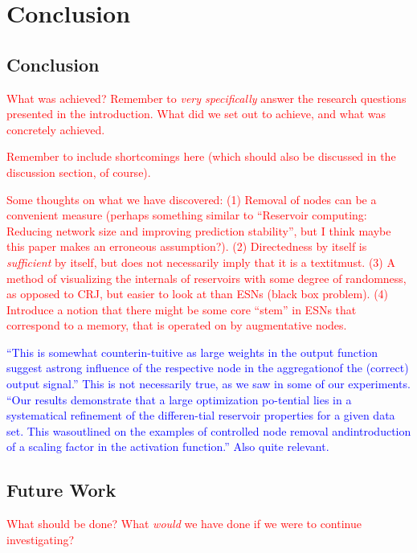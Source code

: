 \chapter{Conclusion}

\section{Conclusion}

\textcolor{red}{
  What was achieved? Remember to \textit{very specifically} answer the research
questions presented in the introduction. What did we set out to achieve, and
what was concretely achieved.
}

\textcolor{red}{
  Remember to include shortcomings here (which should also be discussed in the
discussion section, of course).
}

\textcolor{red}{
  Some thoughts on what we have discovered: (1) Removal of nodes can be a
convenient measure (perhaps something similar to ``Reservoir computing: Reducing
network size and improving prediction stability'', but I think maybe this paper
makes an erroneous assumption?). (2) Directedness by itself is
\textit{sufficient} by itself, but does not necessarily imply that it is a
textit{must}. (3) A method of visualizing the internals of reservoirs with some
degree of randomness, as opposed to CRJ, but easier to look at than ESNs (black
box problem). (4) Introduce a notion that there might be some core ``stem'' in
ESNs that correspond to a memory, that is operated on by augmentative nodes.
}

\textcolor{blue}{
  ``This is somewhat counterin-tuitive as large weights in the output function
suggest astrong influence of the respective node in the aggregationof the
(correct) output signal.'' This is not necessarily true, as we saw in some of
our experiments. ``Our results demonstrate that a large optimization po-tential
lies in a systematical refinement of the differen-tial reservoir properties for
a given data set.  This wasoutlined on the examples of controlled node removal
andintroduction of a scaling factor in the activation function.'' Also quite
relevant.
}

\section{Future Work}

\textcolor{red}{
  What should be done? What \textit{would} we have done if we were to continue
investigating?
}

